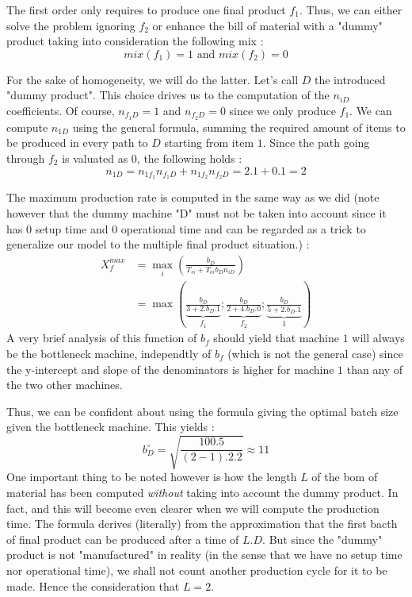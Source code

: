 The first order only requires to produce one final product $f_1$. Thus, we can either solve the problem ignoring $f_2$ or enhance the bill of material with a "dummy" product taking into consideration the following mix : \[ mix(f_1) = 1\textrm{ and }mix(f_2) = 0 \]

For the sake of homogeneity, we will do the latter. Let's call $D$ the introduced "dummy product". This choice drives us to the computation of the $n_{iD}$ coefficients. Of course, $n_{f_1D} = 1$ and $n_{f_2D} = 0$ since we only produce $f_1$. We can compute $n_{1D}$ using the general formula, summing the required amount of items to be produced in every path to $D$ starting from item $1$. Since the path going through $f_2$ is valuated as $0$, the following holds :
\[ n_{1D} = n_{1f_1}n_{f_1D} + n_{1f_2}n_{f_2D} = 2.1 + 0.1 = 2 \]

The maximum production rate is computed in the same way as we did (note however that the dummy machine "D" must not be taken into account since it has $0$ setup time and $0$ operational time and can be regarded as a trick to generalize our model to the multiple final product situation.) :
\[
    \begin{split}
        X_f^{max} &= \max_i\left( \frac{b_D}{T_{si} + T_{oi}b_{D}n_{iD}} \right) \\
        &= \max\left(
            \underbrace{\frac{b_D}{3+2.b_D.1}}_{f_1} ; 
            \underbrace{\frac{b_D}{2+4.b_D.0}}_{f_2} ; 
            \underbrace{\frac{b_D}{5+2.b_D.1}}_{1}
        \right)
    \end{split}
\]
A very brief analysis of this function of $b_f$ should yield that machine $1$ will always be the bottleneck machine, independtly of $b_f$ (which is not the general case) since the y-intercept and slope of the denominators is higher for machine $1$ than any of the two other machines.

Thus, we can be confident about using the formula giving the optimal batch size given the bottleneck machine. This yields : 
\[
    b_D^\circ= \sqrt{ \frac{100.5}{(2-1).2.2}} \approx 11
\]
One important thing to be noted however is how the length $L$ of the bom of material has been computed \textit{without} taking into account the dummy product. In fact, and this will become even clearer when we will compute the production time. The formula derives (literally) from the approximation that the first bacth of final product can be produced after a time of $L.D$. But since the "dummy" product is not "manufactured" in reality (in the sense that we have no setup time nor operational time), we shall not count another production cycle for it to be made. Hence the consideration that $L = 2$. 


